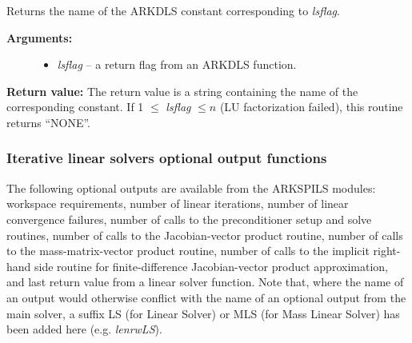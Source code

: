 \documentclass[letterpaper,10pt,english]{sphinxmanual}
\begin{document}
\begin{fulllineitems}
\label{c_interface/User_callable:ARKDlsGetReturnFlagName}
Returns the name of the ARKDLS constant
corresponding to \emph{lsflag}.
\begin{description}
\item[{\textbf{Arguments:}}] \leavevmode\begin{itemize}
\item {} 
\emph{lsflag} -- a return flag from an ARKDLS function.

\end{itemize}

\end{description}

\textbf{Return value:}  The return value is a string containing the name of
the corresponding constant. If 1 $\le$ \emph{lsflag} $\le
n$ (LU factorization failed), this routine returns ``NONE''.

\end{fulllineitems}



\subsubsection{Iterative linear solvers optional output functions}
\label{c_interface/User_callable:iterative-linear-solvers-optional-output-functions}\label{c_interface/User_callable:cinterface-arkspilsoutputs}
The following optional outputs are available from the ARKSPILS
modules: workspace requirements, number of linear iterations, number
of linear convergence failures, number of calls to the preconditioner
setup and solve routines, number of calls to the Jacobian-vector
product routine, number of calls to the mass-matrix-vector
product routine, number of calls to the implicit right-hand side
routine for finite-difference Jacobian-vector product approximation,
and last return value from a linear solver function.  Note that, where
the name of an output would otherwise conflict with the name of an
optional output from the main solver, a suffix LS (for Linear Solver)
or MLS (for Mass Linear Solver) has been added here (e.g. \emph{lenrwLS}).
\end{document}
